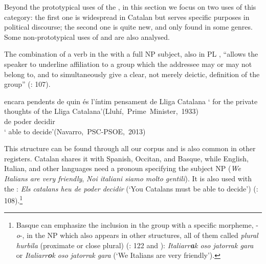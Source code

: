 \documentclass[output=paper]{langscibook}
\begin{document}
Beyond the prototypical uses of the , in this section we focus on two uses of this category: the first one is widespread in Catalan but serves specific purposes in political discourse; the second one is quite new, and only found in some genres. Some non-prototypical uses of  and  are also analysed.



 


\label{sec:nogue:2.1.2.1}





The combination of a verb in the  with a full NP subject, also in PL , “allows the speaker to underline affiliation to a group which the addressee may or may not belong to, and to simultaneously give a clear, not merely deictic, definition of the group” (\citealt{DeCockNogué2017}: 107).




\ea\label{ex:nogue:9}
 \ea\label{ex:nogue:9a}
 {  } {encara}  {pendents de quin és l’íntim pensament de Lliga Catalana}
\glt  `          for the private thoughts of the Lliga Catalana'\hfill\hbox{(Lluhí, Prime Minister, 1933)}\\

 \ex\label{ex:nogue:9b}
{  } {de poder decidir}\\
\glt `      able to decide'\hfill\hbox{(Navarro, PSC-PSOE, 2013)}\\
\z
\z 


This structure can be found through all our corpus and is also common in other registers. Catalan shares it with Spanish, Occitan, and Basque, while English, Italian, and other languages need a  pronoun specifying the subject NP (\textit{We Italians are very friendly}, \textit{Noi italiani siamo molto gentili}). It is also used with the : \textit{Els catalans heu de poder decidir} (‘You Catalans must be able to decide’) (\citealt{DeCockNogué2017}: 108).\footnote{Basque can emphasize the inclusion in the group with a specific morpheme, -\textit{o}{}-, in the NP which also appears in other structures, all of them called \textit{plural hurbila} (proximate or close plural) (\citealt{HualdeUrbina2003}: 122 and \citealt[68–69]{Zubiri2012}): \textit{Italiarr\textbf{a}k oso jatorrak gara} or \textit{Italiarr\textbf{o}k oso jatorrak gara} (`We Italians are very friendly').}
\end{document}

